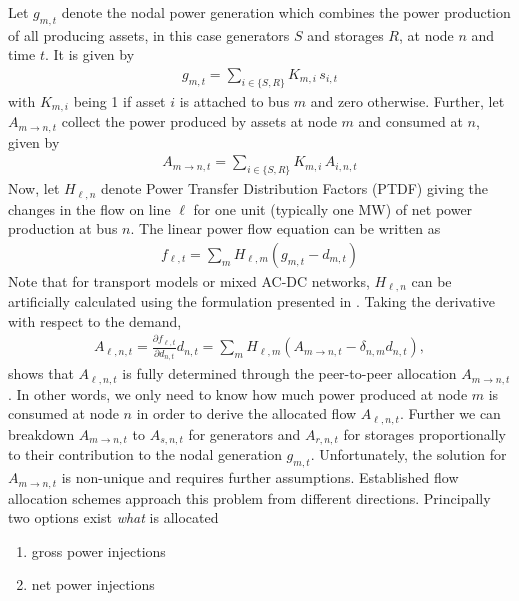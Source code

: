 \documentclass[11pt,twocolumn]{article}
\newcommand{\Forall}[1]{\hspace{10pt} \forall \,\, #1 }
\newcommand{\pdv}[2]{\frac{\partial #1}{\partial #2}}
\newcommand{\state}{s_{i,t}}
\newcommand{\generation}{g_{s,t}}
\newcommand{\nodalgeneration}[1][n]{g_{#1,t}}
\newcommand{\flow}{f_{\ell,t}}
\newcommand{\storage}{g_{r,t}}
\newcommand{\storagedispatch}{\storage^\text{dis}}
\newcommand{\demand}[1][n]{d_{#1,t}}
\newcommand{\incidencegenerator}[1][n]{K_{#1,s}}
\newcommand{\incidencestorage}[1][n]{K_{#1,r}}
\newcommand{\incidenceasset}[1][n]{K_{#1,i}}
\newcommand{\ptdf}[1][n]{H_{\ell,#1}}
\newcommand{\allocategeneration}[1][s, n]{A_{#1,t}}
\newcommand{\allocatestoragedispatch}[1][r, n]{A_{#1,t}}
\newcommand{\allocatepeer}[1][m \rightarrow n]{A_{#1,t}}
\newcommand{\allocateflow}[1][n]{A_{\ell,#1,t}}
\newcommand{\allocatestate}[1][i, n]{A_{#1,t}}
\begin{document}
Let $\nodalgeneration[m]$ denote the nodal power generation which combines the power production of all producing assets, in this case generators $S$ and storages $R$, at node $n$ and time $t$. It is given by 
\begin{align}
    \nodalgeneration[m] = \sum_{i \in \{S, R\}} \incidenceasset[m] \, \state
\end{align}
with $\incidenceasset[m]$ being 1 if asset $i$ is attached to bus $m$ and zero otherwise. Further, let $\allocatepeer$ collect the power produced by assets at node $m$ and consumed at $n$, given by 
\begin{align}
    \allocatepeer = \sum_{i \in \{S,R\}} \incidenceasset[m] \, \allocatestate  
\end{align}
Now, let $\ptdf$ denote Power Transfer Distribution Factors (PTDF) giving the changes in the flow on line $\ell$ for one unit (typically one MW) of net power production at bus $n$. The linear power flow equation can be written as 
\begin{align}
 \flow  = \sum_m \ptdf[m] \left( \nodalgeneration[m] - \demand[m] \right)
 \label{eq:power_flow_equation}  
\end{align}
Note that for transport models or mixed AC-DC networks, $\ptdf$ can be artificially calculated using the formulation presented in \cite{hofmann_flow_2020-1}.
Taking the derivative with respect to the demand, 
\begin{align}
 \allocateflow = \pdv{\flow}{\demand} \demand = \sum_m \ptdf[m] \left( \allocatepeer  - \delta_{n,m} \demand \right) 
 \label{eq:allocate_peer_to_allocate_flow},
\end{align}
shows that $\allocateflow$ is fully determined through the peer-to-peer allocation $\allocatepeer$. In other words, we only need to know how much power produced at node $m$ is consumed at node $n$ in order to derive the allocated flow $\allocateflow$. Further we can breakdown $\allocatepeer$ to $\allocategeneration$ for generators and $\allocatestoragedispatch$ for storages proportionally to their contribution to the nodal generation $\nodalgeneration[m]$. Unfortunately, the solution for $\allocatepeer$ is non-unique and requires further assumptions. Established flow allocation schemes approach this problem from different directions. Principally two options exist \textit{what} is allocated 
% 
\begin{enumerate}
\item gross power injections \label{gross}
\item net power injections \label{net}
\end{enumerate}
\end{document}
